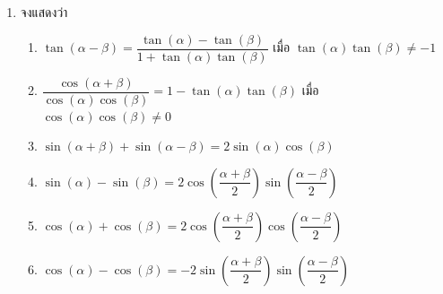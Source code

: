 \begin{enumerate}[label=\arabic*., leftmargin=*, itemsep=1em]
	\item จงแสดงว่า
	\begin{enumerate}[label=\theenumi\arabic*), leftmargin=1.5em, itemsep=0.6em]
		\everymath{\displaystyle}
		\item $\tan \left( \alpha - \beta \right) = \dfrac{\tan \left( \alpha \right) - \tan \left( \beta \right)}{1 + \tan \left( \alpha \right) \tan \left( \beta \right)}$ เมื่อ $\tan \left( \alpha \right) \tan \left( \beta \right) \neq -1$
		\item $\dfrac{\cos \left( \alpha + \beta \right)}{\cos \left( \alpha \right) \cos \left( \beta \right)} = 1 - \tan \left( \alpha \right) \tan \left( \beta \right)$ เมื่อ $\cos \left( \alpha \right) \cos \left( \beta \right) \neq 0$
		\item $\sin \left( \alpha + \beta \right) + \sin \left( \alpha - \beta \right) = 2 \sin \left( \alpha \right) \cos \left( \beta \right)$
		\item $\sin \left( \alpha \right) - \sin \left( \beta \right) = 2 \cos \left( \dfrac{\alpha + \beta}{2} \right) \sin \left( \dfrac{\alpha - \beta}{2} \right)$
		\item $\cos \left( \alpha \right) + \cos \left( \beta \right) = 2 \cos \left( \dfrac{\alpha + \beta}{2} \right) \cos \left( \dfrac{\alpha - \beta}{2} \right)$
		\item $\cos \left( \alpha \right) - \cos \left( \beta \right) = -2 \sin \left( \dfrac{\alpha + \beta}{2} \right) \sin \left( \dfrac{\alpha - \beta}{2} \right)$

\end{enumerate}
\end{enumerate}
